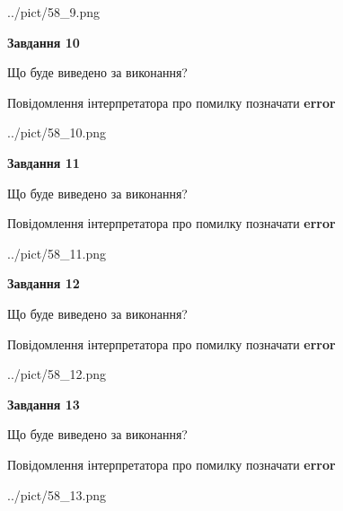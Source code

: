 \documentclass[11pt, ukrainian]{article}
\begin{document}
{\begin {large}
\begin{center}
	{../pict/58_9.png}
\end{center}
\newpage

{\begin {center}\textbf{Завдання 10}\end {center}}\par
Що буде виведено за виконання? \par
Повідомлення інтерпретатора про помилку позначати \textbf{error}

\begin{center}
	{../pict/58_10.png}
\end{center}
\newpage

{\begin {center}\textbf{Завдання 11}\end {center}}\par
Що буде виведено за виконання? \par
Повідомлення інтерпретатора про помилку позначати \textbf{error}

\begin{center}
	{../pict/58_11.png}
\end{center}
\newpage

{\begin {center}\textbf{Завдання 12}\end {center}}\par
Що буде виведено за виконання? \par
Повідомлення інтерпретатора про помилку позначати \textbf{error}

\begin{center}
	{../pict/58_12.png}
\end{center}
\newpage

{\begin {center}\textbf{Завдання 13}\end {center}}\par
Що буде виведено за виконання? \par
Повідомлення інтерпретатора про помилку позначати \textbf{error}

\begin{center}
	{../pict/58_13.png}
\end{center}
\newpage


\end{large}}
\end{document}
